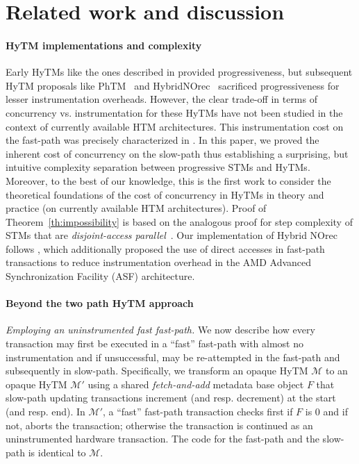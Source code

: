 \section{Related work and discussion}
\label{sec:rel}
%
\paragraph{HyTM implementations and complexity}
Early HyTMs like the ones described in \cite{damronhytm, kumarhytm} provided progressiveness, but
subsequent HyTM proposals like PhTM~\cite{phasedtm} and HybridNOrec~\cite{hybridnorec} sacrificed progressiveness for lesser instrumentation overheads.
However, the clear trade-off in terms of concurrency vs. instrumentation for these HyTMs have not been studied in the context of currently available HTM
architectures. This instrumentation cost on the fast-path was precisely characterized in \cite{hytm14disc}.
In this paper, we proved the inherent cost of concurrency on the slow-path thus establishing a surprising, 
but intuitive complexity separation between progressive STMs and HyTMs.
Moreover, to the best of our knowledge, this is the first work to consider the theoretical foundations of the cost of concurrency in 
HyTMs in theory and practice (on currently available HTM architectures).
Proof of Theorem~\ref{th:impossibility} is based on the analogous proof for step complexity of STMs that are \emph{disjoint-access parallel}~\cite{prog15-pact, tm-book}.
Our implementation of Hybrid NOrec follows \cite{hynorecriegel}, which additionally proposed the use of direct accesses
in fast-path transactions to reduce instrumentation overhead in the AMD Advanced Synchronization Facility (ASF) architecture.

\paragraph{Beyond the two path HyTM approach}
\vspace{1mm}\noindent\textit{Employing an uninstrumented fast fast-path.}
We now describe how every transaction may first be executed in a ``fast'' fast-path with almost no instrumentation
and if unsuccessful, may be re-attempted in the fast-path and subsequently in slow-path.
Specifically, we transform an opaque HyTM $\mathcal{M}$ to an opaque
HyTM $\mathcal{M}'$ using a shared \emph{fetch-and-add} metadata base object $F$ that slow-path updating transactions
increment (and resp. decrement) at the start (and resp. end). In $\mathcal{M}'$, a ``fast'' fast-path transaction checks first if $F$ is $0$
and if not, aborts the transaction; otherwise the transaction is continued as an uninstrumented hardware transaction.
The code for the fast-path and the slow-path is identical to $\mathcal{M}$.

